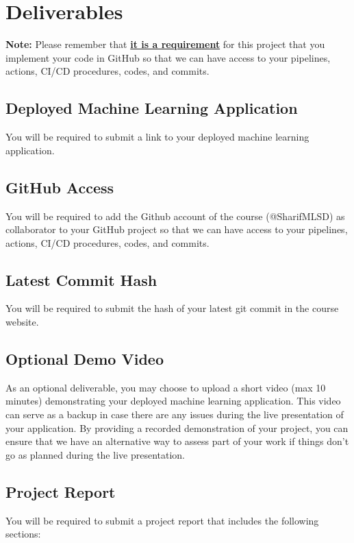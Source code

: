 \documentclass[a4paper]{article}
\begin{document}
	
	
	\section{Deliverables}
	\textbf{Note:} Please remember that \textbf{\underline{it is a requirement}} for this project that you implement your code in GitHub so that we can have access to your pipelines, actions, CI/CD procedures, codes, and commits.
	
	\subsection{Deployed Machine Learning Application}
	You will be required to submit a link to your deployed machine learning application.

	\subsection{GitHub Access}
	You will be required to add the Github account of the course (@SharifMLSD) as collaborator to your GitHub project so that we can have access to your pipelines, actions, CI/CD procedures, codes, and commits.

	\subsection{Latest Commit Hash}
	You will be required to submit the hash of your latest git commit in the course website.

	\subsection{Optional Demo Video}
	As an optional deliverable, you may choose to upload a short video (max 10 minutes) demonstrating your deployed machine learning application. This video can serve as a backup in case there are any issues during the live presentation of your application. By providing a recorded demonstration of your project, you can ensure that we have an alternative way to assess part of your work if things don’t go as planned during the live presentation.

	\subsection{Project Report}
	You will be required to submit a project report that includes the following sections:
\end{document}
